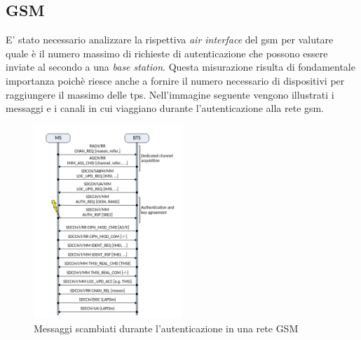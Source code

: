 \subsection{GSM}
E' stato necessario analizzare la rispettiva \textit{air interface} del \gls{gsm} per valutare quale è il numero massimo di richieste di autenticazione 
che possono essere inviate al secondo a una \textit{base station}. Questa misurazione risulta di fondamentale importanza poichè riesce anche a fornire il numero necessario 
di dispositivi per raggiungere il massimo delle \gls{tps}.
Nell'immagine seguente vengono illustrati i messaggi e i canali in cui viaggiano durante l'autenticazione alla rete \gls{gsm}.
\begin{figure}[h]
    \centering
    \includegraphics[width=0.5\textwidth]{images/gsm-air-channel.png}
    \caption{Messaggi scambiati durante l'autenticazione in una rete GSM\cite{gsm-dos-simless}}
\end{figure}

\clearpage

